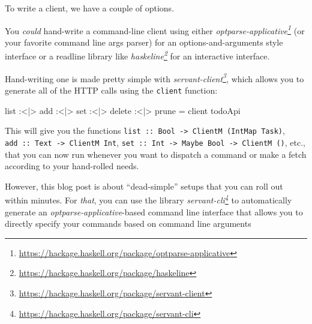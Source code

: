 \documentclass[]{article}
\newenvironment{Shaded}{}{}
\newcommand{\NormalTok}[1]{#1}
\newcommand{\OperatorTok}[1]{\textcolor[rgb]{0.40,0.40,0.40}{#1}}
\newcommand{\OtherTok}[1]{\textcolor[rgb]{0.00,0.44,0.13}{#1}}
\renewcommand{\href}[2]{#2\footnote{\url{#1}}}
\begin{document}
To write a client, we have a couple of options.

You \emph{could} hand-write a command-line client using either
\emph{\href{https://hackage.haskell.org/package/optparse-applicative}{optparse-applicative}}
(or your favorite command line args parser) for an options-and-arguments style
interface or a readline library like
\emph{\href{https://hackage.haskell.org/package/haskeline}{haskeline}} for an
interactive interface.

Hand-writing one is made pretty simple with
\emph{\href{https://hackage.haskell.org/package/servant-client}{servant-client}},
which allows you to generate all of the HTTP calls using the \texttt{client}
function:

\begin{Shaded}
\begin{Highlighting}[]
\NormalTok{list }\OperatorTok{:<|>}\NormalTok{ add }\OperatorTok{:<|>}\NormalTok{ set }\OperatorTok{:<|>}\NormalTok{ delete }\OperatorTok{:<|>}\NormalTok{ prune }\OtherTok{=}\NormalTok{ client todoApi}
\end{Highlighting}
\end{Shaded}

This will give you the functions
\texttt{list\ ::\ Bool\ -\textgreater{}\ ClientM\ (IntMap\ Task)},
\texttt{add\ ::\ Text\ -\textgreater{}\ ClientM\ Int},
\texttt{set\ ::\ Int\ -\textgreater{}\ Maybe\ Bool\ -\textgreater{}\ ClientM\ ()},
etc., that you can now run whenever you want to dispatch a command or make a
fetch according to your hand-rolled needs.

However, this blog post is about ``dead-simple'' setups that you can roll out
within minutes. For \emph{that}, you can use the library
\emph{\href{https://hackage.haskell.org/package/servant-cli}{servant-cli}} to
automatically generate an \emph{optparse-applicative}-based command line
interface that allows you to directly specify your commands based on command
line arguments
\end{document}

